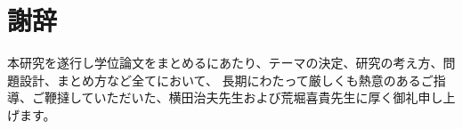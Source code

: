 ﻿%
\chapter*{謝辞}

本研究を遂行し学位論文をまとめるにあたり、テーマの決定、研究の考え方、問題設計、まとめ方など全てにおいて、
長期にわたって厳しくも熱意のあるご指導、ご鞭撻していただいた、横田治夫先生および荒堀喜貴先生に厚く御礼申し上げます。
